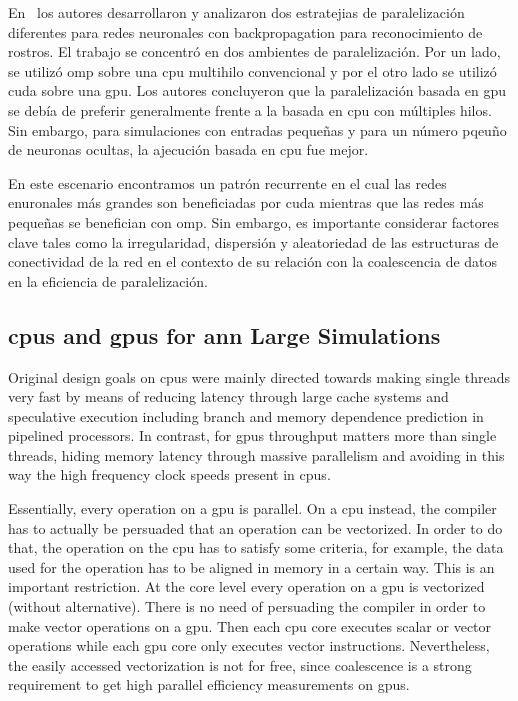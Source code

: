 {En~\cite{HUQQANI2013349} los autores desarrollaron y analizaron dos estratejias de paralelización diferentes para redes neuronales con backpropagation para reconocimiento de rostros.
El trabajo se concentró en dos ambientes de paralelización.
Por un lado, se utilizó \gls{omp} sobre una \gls{cpu} multihilo convencional y por el otro lado se utilizó \gls{cuda} sobre una \gls{gpu}.
Los autores concluyeron que la paralelización basada en \gls{gpu} se debía de preferir generalmente frente a la basada en \gls{cpu} con múltiples hilos.
Sin embargo, para simulaciones con entradas pequeñas y para un número pqeuño de neuronas ocultas, la ajecución basada en \gls{cpu} fue mejor.

En este escenario encontramos un patrón recurrente en el cual las redes enuronales más grandes son beneficiadas por \gls{cuda} mientras que las redes más pequeñas se benefician con \gls{omp}.
Sin embargo, es importante considerar factores clave tales como la irregularidad, dispersión y aleatoriedad de las estructuras de conectividad de la red en el contexto de su relación con la coalescencia de datos en la eficiencia de paralelización.
}{
\subsection{\glspl{cpu} and \glspl{gpu} for \gls{ann} Large Simulations}

Original design goals on \glspl{cpu} were mainly directed towards making single threads very fast by means of reducing latency through large cache systems and speculative execution including branch and memory dependence prediction in pipelined processors. In contrast, for \glspl{gpu} throughput matters more than single threads, hiding memory latency through massive parallelism and avoiding in this way the high frequency clock speeds present in \glspl{cpu}.

Essentially, every operation on a \gls{gpu} is parallel. On a \gls{cpu} instead, the compiler has to actually be persuaded that an operation can be vectorized. In order to do that, the operation on the \gls{cpu} has to satisfy some criteria, for example, the data used for the operation has to be aligned in memory in a certain way. This is an important restriction. At the core level every operation on a \gls{gpu} is vectorized (without alternative). There is no need of persuading the compiler in order to make vector operations on a \gls{gpu}. Then each \gls{cpu} core executes scalar or vector operations while each \gls{gpu} core only executes vector instructions. Nevertheless, the easily accessed vectorization is not for free, since coalescence is a strong requirement to get high parallel efficiency measurements on \glspl{gpu}.

}
